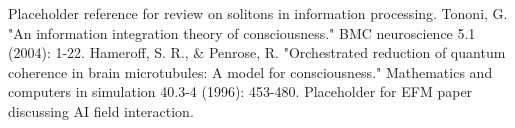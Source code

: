 \documentclass[11pt]{article}
\begin{document}
\begin{thebibliography}{9}
     Placeholder reference for review on solitons in information processing.
     Tononi, G. "An information integration theory of consciousness." BMC neuroscience 5.1 (2004): 1-22.
     Hameroff, S. R., & Penrose, R. "Orchestrated reduction of quantum coherence in brain microtubules: A model for consciousness." Mathematics and computers in simulation 40.3-4 (1996): 453-480.
     Placeholder for EFM paper discussing AI field interaction.
\end{thebibliography}
\end{document}
